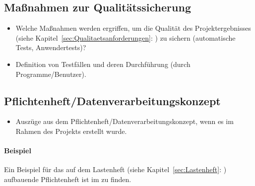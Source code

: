 \subsection{Maßnahmen zur Qualitätssicherung}
\label{sec:Qualitaetssicherung}
\begin{itemize}
	\item Welche Maßnahmen werden ergriffen, um die Qualität des Projektergebnisses (siehe Kapitel~\ref{sec:Qualitaetsanforderungen}: ) zu sichern (\zB automatische Tests, Anwendertests)?
	\item \Ggfs Definition von Testfällen und deren Durchführung (durch Programme/Benutzer).
\end{itemize}


\subsection{Pflichtenheft/Datenverarbeitungskonzept}
\label{sec:Pflichtenheft}
\begin{itemize}
	\item Auszüge aus dem Pflichtenheft/Datenverarbeitungskonzept, wenn es im Rahmen des Projekts erstellt wurde.
\end{itemize}

\paragraph{Beispiel}
Ein Beispiel für das auf dem Lastenheft (siehe Kapitel~\ref{sec:Lastenheft}: ) aufbauende Pflichtenheft ist im  zu finden.
